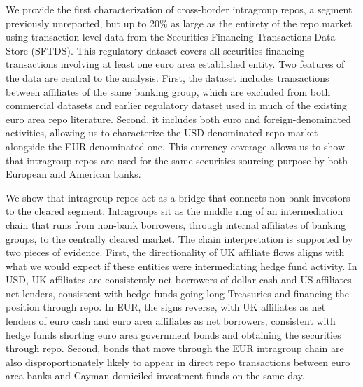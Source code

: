 \documentclass[english, 11pt, oneside, legal]{article}
\begin{document}
We provide the first characterization of cross-border intragroup repos, a segment previously unreported, but up to 20\% as large as the entirety of the repo market using transaction-level data from the Securities Financing Transactions Data Store (SFTDS). This regulatory dataset covers all securities financing transactions involving at least one euro area established entity. Two features of the data are central to the analysis. First, the dataset includes transactions between affiliates of the same banking group, which are excluded from both commercial datasets and earlier regulatory dataset used in much of the existing euro area repo literature. Second, it includes both euro and foreign-denominated activities, allowing us to characterize the USD-denominated repo market alongside the EUR-denominated one. This currency coverage allows us to show that intragroup repos are used for the same securities-sourcing purpose by both European and American banks. 

We show that intragroup repos act as a bridge that connects non-bank investors to the cleared segment. Intragroups sit as the middle ring of an intermediation chain that runs from non-bank borrowers, through internal affiliates of banking groups, to the centrally cleared market. %
The chain interpretation is supported by two pieces of evidence. First, the directionality of UK affiliate flows aligns with what we would expect if these entities were intermediating hedge fund activity. In USD, UK affiliates are consistently net borrowers of dollar cash and US affiliates net lenders, consistent with hedge funds going long Treasuries and financing the position through repo. In EUR, the signs reverse, with UK affiliates as net lenders of euro cash and euro area affiliates as net borrowers, consistent with hedge funds shorting euro area government bonds and obtaining the securities through repo. Second, bonds that move through the EUR intragroup chain are also disproportionately likely to appear in direct repo transactions between euro area banks and Cayman domiciled investment funds on the same day. 
\end{document}

